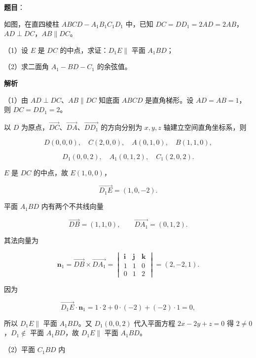 \begin{answer}

\textbf{题目}：

如图，在直四棱柱 $ABCD-A_1B_1C_1D_1$ 中，已知 $DC=DD_1=2AD=2AB$，$AD\perp DC$，$AB\parallel DC$。

（1）设 $E$ 是 $DC$ 的中点，求证：$D_1E\parallel$ 平面 $A_1BD$；

（2）求二面角 $A_1-BD-C_1$ 的余弦值。
\nopagebreak[4]
\begin{center}\end{center}
\nopagebreak[4]
\textbf{解析}

（1）由 $AD\perp DC$、$AB\parallel DC$ 知底面 $ABCD$ 是直角梯形。设 $AD=AB=1$，则 $DC=DD_1=2$。

以 $D$ 为原点，$\overrightarrow{DC}$、$\overrightarrow{DA}$、$\overrightarrow{DD_1}$ 的方向分别为 $x,y,z$ 轴建立空间直角坐标系，则

\nopagebreak[4]
\[D(0,0,0),\quad C(2,0,0),\quad A(0,1,0),\quad B(1,1,0),\]

\nopagebreak[4]
\[D_1(0,0,2),\quad A_1(0,1,2),\quad C_1(2,0,2).\]

$E$ 是 $DC$ 的中点，故 $E(1,0,0)$，

\nopagebreak[4]
\[\overrightarrow{D_1E}=(1,0,-2).\]

平面 $A_1BD$ 内有两个不共线向量

\nopagebreak[4]
\[\overrightarrow{DB}=(1,1,0),\qquad\overrightarrow{DA_1}=(0,1,2).\]

其法向量为

\nopagebreak[4]
\[\boldsymbol n_1=\overrightarrow{DB}\times\overrightarrow{DA_1}=
\begin{vmatrix}
\boldsymbol i&\boldsymbol j&\boldsymbol k\\
1&1&0\\
0&1&2
\end{vmatrix}=(2,-2,1).\]

因为

\nopagebreak[4]
\[\overrightarrow{D_1E}\cdot\boldsymbol n_1=1\cdot2+0\cdot(-2)+(-2)\cdot1=0,\]

所以 $D_1E\parallel$ 平面 $A_1BD$。又 $D_1(0,0,2)$ 代入平面方程 $2x-2y+z=0$ 得 $2\neq0$，$D_1\notin$ 平面 $A_1BD$，故 $D_1E\parallel$ 平面 $A_1BD$。

（2）平面 $C_1BD$ 内


\end{answer}
